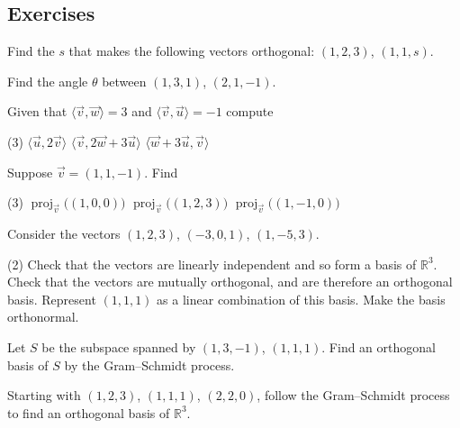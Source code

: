 \subsection{Exercises}

\begin{exercise}
Find the $s$ that makes the following vectors orthogonal:
$(1,2,3)$, $(1,1,s)$.
\end{exercise}

\begin{exercise}
Find the angle $\theta$ between
$(1,3,1)$, $(2,1,-1)$.
\end{exercise}

\begin{exercise}
Given that $\langle \vec{v} , \vec{w} \rangle = 3$ and
$\langle \vec{v} , \vec{u} \rangle = -1$ compute
\begin{tasks}(3)
\task $\langle \vec{u} , 2 \vec{v} \rangle$
\task $\langle \vec{v} , 2 \vec{w} + 3 \vec{u} \rangle$
\task $\langle \vec{w} + 3 \vec{u}, \vec{v} \rangle$
\end{tasks}
\end{exercise}

\begin{exercise}
Suppose $\vec{v} = (1,1,-1)$.  Find
\begin{tasks}(3)
\task $\operatorname{proj}_{\vec{v}}\bigl( (1,0,0) \bigr)$
\task $\operatorname{proj}_{\vec{v}}\bigl( (1,2,3) \bigr)$
\task $\operatorname{proj}_{\vec{v}}\bigl( (1,-1,0) \bigr)$
\end{tasks}
\end{exercise}

\begin{exercise}
\pagebreak[2]
Consider the vectors $(1,2,3)$, $(-3,0,1)$, $(1,-5,3)$.
\begin{tasks}(2)
\task Check that the vectors are linearly independent and so form a basis of ${\mathbb{R}}^3$.
\task Check that the vectors are mutually orthogonal, and are therefore
an orthogonal basis.
\task Represent $(1,1,1)$ as a linear combination of this basis.
\task Make the basis orthonormal.
\end{tasks}
\end{exercise}

\begin{exercise}
Let $S$ be the subspace spanned by
$(1,3,-1)$, $(1,1,1)$.  Find an orthogonal basis of $S$
by the Gram--Schmidt process.
\end{exercise}

\begin{exercise}
Starting with $(1,2,3)$, $(1,1,1)$, $(2,2,0)$, follow the Gram--Schmidt
process to find an orthogonal basis of ${\mathbb{R}}^3$.
\end{exercise}

